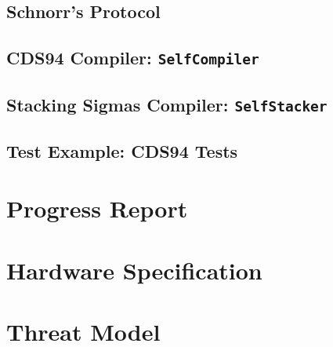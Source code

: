 \section{Schnorr's Protocol}\label{code:schnorr}


\section{CDS94 Compiler: \texttt{SelfCompiler}}\label{code:cds}


\section{Stacking Sigmas Compiler: \texttt{SelfStacker}}\label{code:stacksig}


\section{Test Example: CDS94 Tests}\label{code:cds-tests}


\chapter{Progress Report}


\chapter{Hardware Specification}
\label{sec:hardware-spec}



\chapter{Threat Model}
\label{sec:threat-model-appendix}
